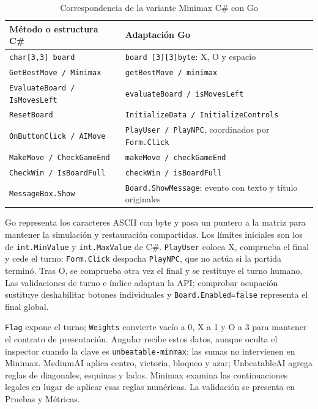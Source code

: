 \documentclass[12pt,a4paper]{article}
\begin{document}
\begin{table}[H]
\centering\small
\caption{Correspondencia de la variante Minimax C\# con Go}
\begin{tabular}{p{6.3cm}p{6.3cm}}
\toprule Método o estructura C\# & Adaptación Go\\\midrule
\texttt{char[3,3] board} & \texttt{board [3][3]byte}: X, O y espacio\\
\texttt{GetBestMove / Minimax} & \texttt{getBestMove / minimax}\\
\texttt{EvaluateBoard / IsMovesLeft} & \texttt{evaluateBoard / isMovesLeft}\\
\texttt{ResetBoard} & \texttt{InitializeData / InitializeControls}\\
\texttt{OnButtonClick / AIMove} & \texttt{PlayUser / PlayNPC}, coordinados por \texttt{Form.Click}\\
\texttt{MakeMove / CheckGameEnd} & \texttt{makeMove / checkGameEnd}\\
\texttt{CheckWin / IsBoardFull} & \texttt{checkWin / isBoardFull}\\
\texttt{MessageBox.Show} & \texttt{Board.ShowMessage}: evento con texto y título originales\\
\bottomrule
\end{tabular}
\end{table}

Go representa los caracteres ASCII con byte y pasa un puntero a la matriz para
mantener la simulación y restauración compartidas. Los límites iniciales son los
de \texttt{int.MinValue} y \texttt{int.MaxValue} de C\#. \texttt{PlayUser} coloca X,
comprueba el final y cede el turno; \texttt{Form.Click} despacha \texttt{PlayNPC},
que no actúa si la partida terminó. Tras O, se comprueba otra vez el final y se
restituye el turno humano. Las validaciones de turno e índice adaptan la API;
comprobar ocupación sustituye deshabilitar botones individuales y
\texttt{Board.Enabled=false} representa el final global.

\texttt{Flag} expone el turno; \texttt{Weights} convierte vacío a 0, X a 1 y O a 3
para mantener el contrato de presentación. Angular recibe estos datos, aunque
oculta el inspector cuando la clave es \texttt{unbeatable-minmax}; las sumas no
intervienen en Minimax.
MediumAI aplica centro, victoria, bloqueo y azar; UnbeatableAI agrega reglas de
diagonales, esquinas y lados. Minimax examina las continuaciones legales en lugar
de aplicar esas reglas numéricas. La validación se presenta en Pruebas y Métricas.
\end{document}
